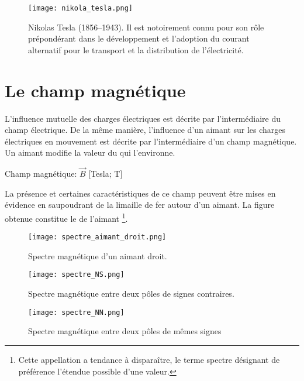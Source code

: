 \begin{figure}[ht]
    \centering
    \texttt{[image: nikola\_tesla.png]}
    \caption{Nikolas Tesla (1856--1943). Il est notoirement connu pour son rôle prépondérant dans le développement et l'adoption du courant alternatif pour le transport et la distribution de l'électricité.}
    \label{nikola_tesla}
\end{figure}

\newpage

\section{Le champ magnétique}
L'influence mutuelle des charges électriques est décrite par l'intermédiaire du champ électrique.
De la même manière, l'influence d'un aimant sur les charges électriques en mouvement est décrite par l'intermédiaire d'un champ magnétique.
Un aimant modifie la valeur du  qui l'environne.
\begin{encadre}
    Champ magnétique: \(\vec{B}\) [Tesla; T]
\end{encadre}
La présence et certaines caractéristiques de ce champ peuvent être mises en évidence en saupoudrant de la limaille de fer autour d'un aimant. La figure obtenue constitue le  de l'aimant \footnote{Cette appellation a tendance à disparaître, le terme spectre désignant de préférence l'étendue possible d'une valeur.}.


\begin{figure}[!ht]
    \centering
    \texttt{[image: spectre\_aimant\_droit.png]}
    \caption{Spectre magnétique d'un aimant droit.}
    \label{spectre_aimant_droit}
\end{figure}

\begin{figure}[!ht]
    \centering
    \begin{minipage}[b]{.47\linewidth}
        \centering
        \texttt{[image: spectre\_NS.png]}
        \caption{Spectre magnétique entre deux pôles de signes contraires.}
        \label{spectre_NS}
    \end{minipage}
    \begin{minipage}[b]{.47\linewidth}
        \centering
        \texttt{[image: spectre\_NN.png]}
        \caption{Spectre magnétique entre deux pôles de mêmes signes}
        \label{spectre_NN}
    \end{minipage}
\end{figure}

